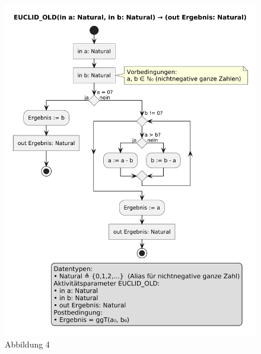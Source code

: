 \documentclass[12pt]{article}
\begin{document}
\begin{figure}[H]
  \centering
  \includegraphics[width=\linewidth,keepaspectratio]{4.png}
  \caption{Abbildung 4}
\end{figure}
\end{document}
